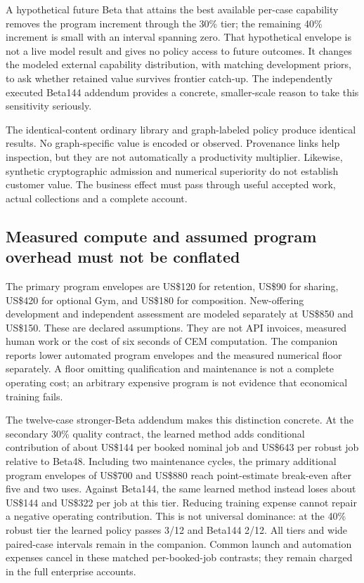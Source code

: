 \documentclass[11pt,letterpaper]{article}
\newcommand{\USD}{US\$}
\begin{document}
A hypothetical future Beta that attains the best available per-case capability removes the program increment through the 30\% tier; the remaining 40\% increment is small with an interval spanning zero. That hypothetical envelope is not a live model result and gives no policy access to future outcomes. It changes the modeled external capability distribution, with matching development priors, to ask whether retained value survives frontier catch-up. The independently executed Beta144 addendum provides a concrete, smaller-scale reason to take this sensitivity seriously.

The identical-content ordinary library and graph-labeled policy produce identical results. No graph-specific value is encoded or observed. Provenance links help inspection, but they are not automatically a productivity multiplier. Likewise, synthetic cryptographic admission and numerical superiority do not establish customer value. The business effect must pass through useful accepted work, actual collections and a complete account.

\subsection{Measured compute and assumed program overhead must not be conflated}

The primary program envelopes are \USD120 for retention, \USD90 for sharing, \USD420 for optional Gym, and \USD180 for composition. New-offering development and independent assessment are modeled separately at \USD850 and \USD150. These are declared assumptions. They are not API invoices, measured human work or the cost of six seconds of CEM computation. The companion reports lower automated program envelopes and the measured numerical floor separately. A floor omitting qualification and maintenance is not a complete operating cost; an arbitrary expensive program is not evidence that economical training fails.

The twelve-case stronger-Beta addendum makes this distinction concrete. At the secondary 30\% quality contract, the learned method adds conditional contribution of about \USD144 per booked nominal job and \USD643 per robust job relative to Beta48. Including two maintenance cycles, the primary additional program envelopes of \USD700 and \USD880 reach point-estimate break-even after five and two uses. Against Beta144, the same learned method instead loses about \USD144 and \USD322 per job at this tier. Reducing training expense cannot repair a negative operating contribution. This is not universal dominance: at the 40\% robust tier the learned policy passes 3/12 and Beta144 2/12. All tiers and wide paired-case intervals remain in the companion. Common launch and automation expenses cancel in these matched per-booked-job contrasts; they remain charged in the full enterprise accounts.
\end{document}
